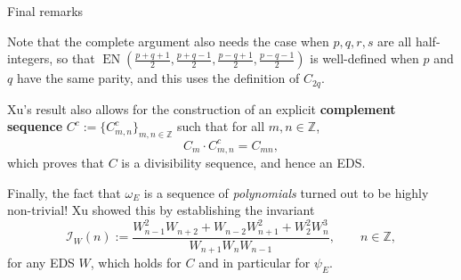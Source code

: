\documentclass[10pt]{beamer}
\begin{document}
\begin{frame}[t]{Final remarks}

Note that the complete argument also needs the case when $ p, q, r, s $ are all half-integers, so that $ \operatorname{EN}(\tfrac{p + q + 1}{2}, \tfrac{p + q - 1}{2}, \tfrac{p - q + 1}{2}, \tfrac{p - q - 1}{2}) $ is well-defined when $ p $ and $ q $ have the same parity, and this uses the definition of $ C_{2q} $.

\vspace{0.5cm} Xu's result also allows for the construction of an explicit \textbf{complement sequence} $ C^c := \{C_{m, n}^c\}_{m, n \in \mathbb{Z}} $ such that for all $ m, n \in \mathbb{Z} $,
$$ C_m \cdot C_{m, n}^c = C_{mn}, $$
which proves that $ C $ is a divisibility sequence, and hence an EDS.

\vspace{0.5cm} Finally, the fact that $ \omega_E $ is a sequence of \emph{polynomials} turned out to be highly non-trivial! Xu showed this by establishing the invariant
$$ \mathcal{I}_W(n) := \dfrac{W_{n - 1}^2W_{n + 2} + W_{n - 2}W_{n + 1}^2 + W_2^2W_n^3}{W_{n + 1}W_nW_{n - 1}}, \qquad n \in \mathbb{Z}, $$
for any EDS $ W $, which holds for $ C $ and in particular for $ \psi_E $.

\end{frame}
\end{document}
